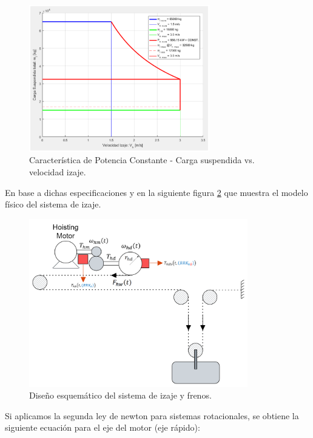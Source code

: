 \documentclass[11pt]{article}
\begin{document}
\begin{figure}[h!]
	\centering
	\includegraphics[width=0.7\textwidth]{images/imagen_4_curva_pot_cte.png}
	\caption{Característica de Potencia Constante - Carga suspendida vs. velocidad izaje.}
	\label{fig:curva_potencia_motor}
\end{figure}

\newpage

En base a dichas especificaciones y en la siguiente figura \ref{fig:sistema_izaje} que muestra el modelo físico del sistema de izaje.

\begin{figure}[h!]
	\centering
	\includegraphics[width=0.85\textwidth]{images/imagen_5_sistema_izaje.png}
	\caption{Diseño esquemático del sistema de izaje y frenos.}
	\label{fig:sistema_izaje}
\end{figure}

Si aplicamos la segunda ley de newton para sistemas rotacionales, se obtiene la siguiente ecuación para el eje del motor (eje rápido):
\end{document}
